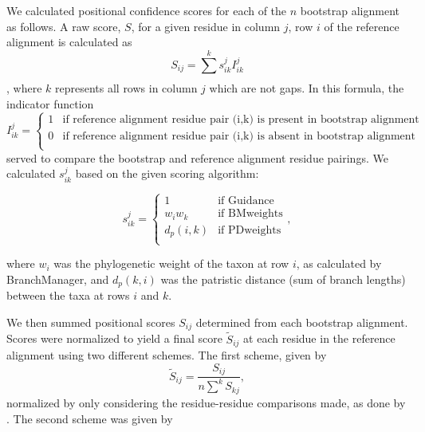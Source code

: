 \documentclass[10pt]{article}
\begin{document}
We calculated positional confidence scores for each of the $n$ bootstrap alignment as follows. A raw score, $S$, for a given residue in column $j$, row $i$ of the reference alignment is calculated as \begin{equation} S_{ij} = \sum\limits_{}^k s_{ik}^j I_{ik}^j\end{equation}, where $k$ represents all rows in column $j$ which are not gaps. 
In this formula, the indicator function 
\begin{equation}I_{ik}^j = \left\{ \begin{array}{rl}

              1                         &\mbox{if reference alignment residue pair (i,k) is present in bootstrap alignment} \\
              0            &\mbox{if reference alignment residue pair (i,k) is absent in bootstrap alignment} \\
                     \end{array} \right. 
\end{equation}
served to compare the bootstrap and reference alignment residue pairings.
We calculated $s_{ik}^j$ based on the given scoring algorithm:

\begin{equation}
s_{ik}^j = \left\{ \begin{array}{rl}

              1                         &\mbox{if Guidance} \\
              w_iw_k              &\mbox{if BMweights} \\
              d_p(i,k)              &\mbox{if PDweights} \\
                     \end{array} \right.,
\end{equation}

where $w_i$ was the phylogenetic weight of the taxon at row $i$, as calculated by BranchManager, and $d_p(k,i)$ was the patristic distance (sum of branch lengths) between the taxa at rows $i$ and $k$. 

We then summed positional scores $S_{ij}$ determined from each bootstrap alignment. Scores were normalized to yield a final score $\widetilde{S}_{ij}$ at each residue in the reference alignment using two different schemes. The first scheme, given by \begin{equation} \widetilde{S}_{ij} = \frac{S_{ij}}{n\sum\limits_{}^k S_{kj}}, \end{equation} normalized by only considering the residue-residue comparisons made, as done by \citep{Penn2010}. The second scheme was given by 
\end{document}
